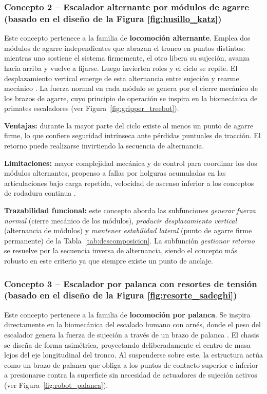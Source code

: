 \documentclass[lettersize,journal]{IEEEtran}
\begin{document}
\subsubsection{Concepto 2 -- Escalador alternante por módulos de agarre (basado en el diseño de la Figura \ref{fig:husillo_katz})}

Este concepto pertenece a la familia de \textbf{locomoción alternante}. Emplea dos
módulos de agarre independientes que abrazan el tronco en puntos distintos: mientras
uno sostiene el sistema firmemente, el otro libera su sujeción, avanza hacia arriba y
vuelve a fijarse. Luego invierten roles y el ciclo se repite. El desplazamiento
vertical emerge de esta alternancia entre sujeción y rearme mecánico
\cite{LamXu2011ICRA, Katz2011TreeClimbing}. La fuerza normal en cada módulo se genera
por el cierre mecánico de los brazos de agarre, cuyo principio de operación se
inspira en la biomecánica de primates escaladores
(ver Figura~\ref{fig:gripper_treebot}).

\textbf{Ventajas:} durante la mayor parte del ciclo existe al menos un punto de
agarre firme, lo que confiere seguridad intrínseca ante pérdidas puntuales de
tracción. El retorno puede realizarse invirtiendo la secuencia de alternancia.

\textbf{Limitaciones:} mayor complejidad mecánica y de control para coordinar los
dos módulos alternantes, propenso a fallas por holguras acumuladas en las
articulaciones bajo carga repetida, velocidad de ascenso inferior a los conceptos
de rodadura continua \cite{DubeyEtAl2016Coconut}.

\textbf{Trazabilidad funcional:} este concepto aborda las subfunciones \emph{generar
fuerza normal} (cierre mecánico de los módulos), \emph{producir desplazamiento
vertical} (alternancia de módulos) y \emph{mantener estabilidad lateral} (punto de
agarre firme permanente) de la Tabla~\ref{tab:descomposicion}. La subfunción
\emph{gestionar retorno} se resuelve por la secuencia inversa de alternancia, siendo
el concepto más robusto en este criterio ya que siempre existe un punto de anclaje.

\subsubsection{Concepto 3 -- Escalador por palanca con resortes de tensión (basado en el diseño de la Figura \ref{fig:resorte_sadeghi})}

Este concepto pertenece a la familia de \textbf{locomoción por palanca}. Se inspira
directamente en la biomecánica del escalado humano con arnés, donde el peso del
escalador genera la fuerza de sujeción a través de un brazo de palanca
\cite{Sadeghi2012HumanInspired, sibasad2017}. El chasis se diseña de forma
asimétrica, proyectando deliberadamente el centro de masa lejos del eje longitudinal
del tronco. Al suspenderse sobre este, la estructura actúa como un brazo de palanca
que obliga a los puntos de contacto superior e inferior a presionarse contra la
superficie sin necesidad de actuadores de sujeción activos
(ver Figura~\ref{fig:robot_palanca}).
\end{document}
